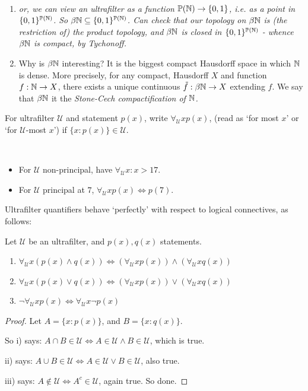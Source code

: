 \documentclass[10pt]{article}
\newcommand{\U}{\mathcal{U}}
\begin{document}
\begin{remark*}[Remarks]\ 
    \begin{enumerate}
        \item \it{or}, we can view an ultrafilter as a function $\mathbb{P}(\mathbb{N}) \rightarrow \{0,1\}$, \it{i.e.} as a point in $\{0,1\}^{\mathbb{P}(\mathbb{N})}$. So $\beta\mathbb{N} \subseteq \{0,1\}^{\mathbb{P}(\mathbb{N})}$. Can check that our topology on $\beta\mathbb{N}$ is (the restriction of) the product topology, and $\beta\mathbb{N}$ is closed in $\{0,1\}^{\mathbb{P}(\mathbb{N})}$ - whence $\beta\mathbb{N}$ is compact, by Tychonoff.
        \item Why is $\beta\mathbb{N}$ interesting? It is the biggest compact Hausdorff space in which $\mathbb{N}$ is dense. More precisely, for any compact, Hausdorff $X$ and function $f:\mathbb{N}\rightarrow X$, there exists a unique continuous $\tilde{f}:\beta\mathbb{N} \rightarrow X$ extending $f$. We say that $\beta\mathbb{N}$ it the \it{Stone-Cech compactification} of $\mathbb{N}$.
    \end{enumerate}
\end{remark*}

\begin{defin*}
    For ultrafilter $\U$ and statement $p(x)$, write $\forall_\U xp(x)$, (read as `for most $x$' or `for $\U$-most $x$') if $\{x : p(x)\}\in \U$.
\end{defin*}
\begin{remark*}[Examples]\ 
    \begin{itemize}
        \item For $\U$ non-principal, have $\forall_\U x : x > 17$.
        \item For $\U$ principal at $7$, $\forall_\U xp(x) \iff p(7)$.
    \end{itemize}
\end{remark*}

Ultrafilter quantifiers behave `perfectly' with respect to logical connectives, as follows:

\begin{prop}
    Let $\U$ be an ultrafilter, and $p(x),q(x)$ statements.
    \begin{enumerate}[label = \roman*)]
        \item $\forall_\U x (p(x)\land q(x)) \iff (\forall_\U x p(x))\land (\forall_\U x q(x))$
        \item $\forall_\U x (p(x) \lor q(x)) \iff (\forall_\U xp(x))\lor (\forall_\U xq(x))$
        \item $\neg \forall_\U xp(x) \iff \forall_\U x \neg p(x)$
    \end{enumerate}
\end{prop}
\begin{proof}
    Let $A = \{x : p(x)\}$, and $B = \{x : q(x)\}$.

    So i) says: $A\cap B \in \U \iff A \in \U \land B \in \U$, which is true.

    ii) says: $A\cup B \in \U \iff A\in \U \lor B \in \U$, also true.

    iii) says: $A\not \in \U \iff A^c \in \U$, again true. So done.
\end{proof}
\end{document}
